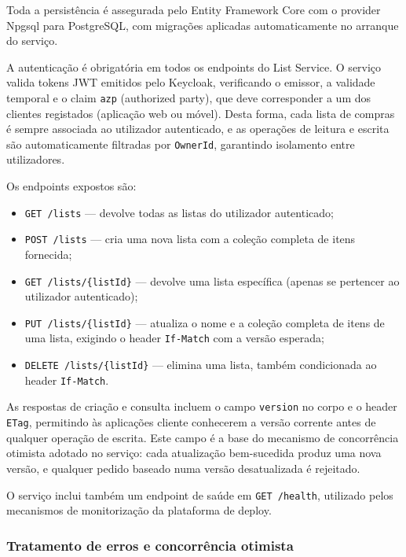 Toda a persistência é assegurada pelo Entity Framework Core com o provider Npgsql para PostgreSQL, com migrações aplicadas automaticamente no arranque do serviço.

A autenticação é obrigatória em todos os endpoints do List Service. O serviço valida tokens \ac{JWT} emitidos pelo Keycloak, verificando o emissor, a validade temporal e o claim \texttt{azp} (authorized party), que deve corresponder a um dos clientes registados (aplicação web ou móvel). Desta forma, cada lista de compras é sempre associada ao utilizador autenticado, e as operações de leitura e escrita são automaticamente filtradas por \texttt{OwnerId}, garantindo isolamento entre utilizadores.

Os endpoints expostos são:

\begin{itemize}
    \item \texttt{GET /lists} — devolve todas as listas do utilizador autenticado;
    \item \texttt{POST /lists} — cria uma nova lista com a coleção completa de itens fornecida;
    \item \texttt{GET /lists/\{listId\}} — devolve uma lista específica (apenas se pertencer ao utilizador autenticado);
    \item \texttt{PUT /lists/\{listId\}} — atualiza o nome e a coleção completa de itens de uma lista, exigindo o header \texttt{If-Match} com a versão esperada;
    \item \texttt{DELETE /lists/\{listId\}} — elimina uma lista, também condicionada ao header \texttt{If-Match}.
\end{itemize}

As respostas de criação e consulta incluem o campo \texttt{version} no corpo e o header \texttt{ETag}, permitindo às aplicações cliente conhecerem a versão corrente antes de qualquer operação de escrita. Este campo é a base do mecanismo de concorrência otimista adotado no serviço: cada atualização bem-sucedida produz uma nova versão, e qualquer pedido baseado numa versão desatualizada é rejeitado.

O serviço inclui também um endpoint de saúde em \texttt{GET /health}, utilizado pelos mecanismos de monitorização da plataforma de deploy.

\subsubsection{Tratamento de erros e concorrência otimista}
\label{sec:4.2.1.1}

